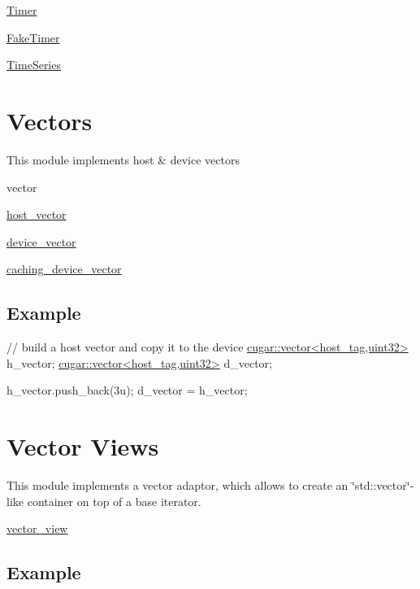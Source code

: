 \begin{DoxyItemize}
\item \hyperlink{structcugar_1_1_timer}{Timer}
\item \hyperlink{structcugar_1_1_fake_timer}{Fake\+Timer}
\item \hyperlink{structcugar_1_1_time_series}{Time\+Series} 
\end{DoxyItemize}\hypertarget{vectors_page}{}\section{Vectors}\label{vectors_page}
This module implements host \& device vectors


\begin{DoxyItemize}
\item vector
\item \hyperlink{structcugar_1_1host__vector}{host\+\_\+vector}
\item \hyperlink{structcugar_1_1device__vector}{device\+\_\+vector}
\item \hyperlink{structcugar_1_1caching__device__vector}{caching\+\_\+device\+\_\+vector}
\end{DoxyItemize}\hypertarget{vectors_page_VectorsExampleSection}{}\subsection{Example}\label{vectors_page_VectorsExampleSection}

\begin{DoxyCode}
\textcolor{comment}{// build a host vector and copy it to the device}
\hyperlink{structcugar_1_1vector}{cugar::vector<host\_tag,uint32>} h\_vector;
\hyperlink{structcugar_1_1vector}{cugar::vector<host\_tag,uint32>} d\_vector;

h\_vector.push\_back(3u);
d\_vector = h\_vector;
\end{DoxyCode}
 \hypertarget{vector_views_page}{}\section{Vector Views}\label{vector_views_page}
This module implements a vector adaptor, which allows to create an \char`\"{}std\+::vector\char`\"{}-\/like container on top of a base iterator.


\begin{DoxyItemize}
\item \hyperlink{structcugar_1_1vector__view}{vector\+\_\+view}
\end{DoxyItemize}\hypertarget{vector_views_page_VectorViewExampleSection}{}\subsection{Example}\label{vector_views_page_VectorViewExampleSection}

